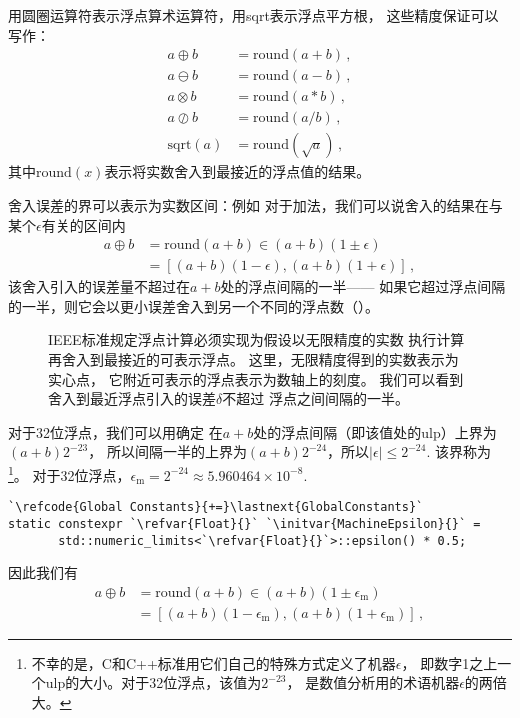 用圆圈运算符表示浮点算术运算符，用sqrt表示浮点平方根，
这些精度保证可以写作：
\begin{align}
    a\oplus b        & =\mathrm{round}(a+b)\, ,\nonumber      \\
    a\ominus b       & =\mathrm{round}(a-b)\, ,\nonumber      \\
    a\otimes b       & =\mathrm{round}(a*b)\, ,\label{eq:3.7} \\
    a\oslash b       & =\mathrm{round}(a/b)\, ,\nonumber      \\
    \mathrm{sqrt}(a) & =\mathrm{round}(\sqrt{a})\, ,\nonumber
\end{align}
其中$\mathrm{round}(x)$表示将实数舍入到最接近的浮点值的结果。

舍入误差的界可以表示为实数区间：例如
对于加法，我们可以说舍入的结果在与某个$\epsilon$有关的区间内
\begin{align}
    a\oplus b & =\mathrm{round}(a+b)\in(a+b)(1\pm\epsilon)\nonumber \\
              & =[(a+b)(1-\epsilon),(a+b)(1+\epsilon)]\, ,
    \label{eq:3.8}
\end{align}
该舍入引入的误差量不超过在$a+b$处的浮点间隔的一半——
如果它超过浮点间隔的一半，则它会以更小误差舍入到另一个不同的浮点数（）。
\begin{figure}[htbp]
    \centering
    \caption{IEEE标准规定浮点计算必须实现为假设以无限精度的实数
        执行计算再舍入到最接近的可表示浮点。
        这里，无限精度得到的实数表示为实心点，
        它附近可表示的浮点表示为数轴上的刻度。
        我们可以看到舍入到最近浮点引入的误差$\delta$不超过
        浮点之间间隔的一半。}
    \label{fig:3.41}
\end{figure}

对于32位浮点，我们可以用确定
在$a+b$处的浮点间隔（即该值处的ulp）上界为$(a+b)2^{-23}$，
所以间隔一半的上界为$(a+b)2^{-24}$，所以$|\epsilon|\le2^{-24}$.
该界称为
\footnote{不幸的是，C和C++标准用它们自己的特殊方式定义了机器$\epsilon$，
    即数字1之上一个ulp的大小。对于32位浮点，该值为$2^{-23}$，
    是数值分析用的术语机器$\epsilon$的两倍大。}。
对于32位浮点，$\epsilon_{\mathrm{m}}=2^{-24}\approx5.960464\times10^{-8}$.
\begin{lstlisting}
`\refcode{Global Constants}{+=}\lastnext{GlobalConstants}`
static constexpr `\refvar{Float}{}` `\initvar{MachineEpsilon}{}` =
       std::numeric_limits<`\refvar{Float}{}`>::epsilon() * 0.5;
\end{lstlisting}
因此我们有
\begin{align*}
    a\oplus b & =\mathrm{round}(a+b)\in(a+b)(1\pm\epsilon_{\mathrm{m}})\nonumber     \\
              & =[(a+b)(1-\epsilon_{\mathrm{m}}),(a+b)(1+\epsilon_{\mathrm{m}})]\, ,
\end{align*}

